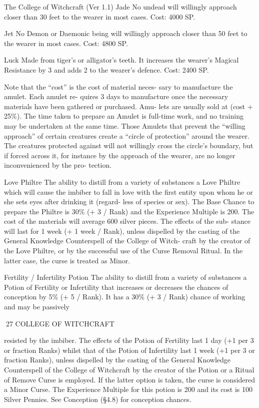 \begin{Chapter}{The College of Witchcraft (Ver 1.1)}
Jade  No  undead  will  willingly  approach  closer 
than 30 feet to the wearer in most cases. Cost: 4000 
SP. 

Jet  No  Demon  or  Daemonic  being  will  willingly 
approach closer than 50 feet to the wearer in most 
cases. Cost: 4800 SP. 

Luck  Made  from  tiger’s  or  alligator’s  teeth.  It 
increases the wearer’s Magical Resistance by 3 and 
adds 2 to the wearer’s defence. Cost: 2400 SP. 

Note  that  the  “cost”  is  the  cost  of  material  neces-
sary  to  manufacture  the  amulet.  Each  amulet  re-
quires  3  days  to  manufacture  once  the  necessary 
materials  have  been  gathered  or  purchased.  Amu-
lets  are  usually  sold  at  (cost  +  25\%).  The  time 
taken  to  prepare  an  Amulet  is  full-time  work,  and 
no  training  may  be  undertaken  at  the  same  time. 
Those Amulets that prevent the “willing approach” 
of  certain  creatures  create  a  “circle  of  protection” 
around the wearer. The creatures protected against 
will not willingly cross the circle’s boundary, but if 
forced across it, for instance by the approach of the 
wearer,  are  no  longer  inconvenienced  by  the  pro-
tection. 

Love Philtre The ability to distill from a variety of 
substances  a  Love  Philtre  which  will  cause  the 
imbiber  to  fall  in  love  with  the  first  entity  upon 
whom he or she sets eyes after drinking it (regard-
less of species or sex). The Base Chance to prepare 
the Philtre is 30\% (+ 3 / Rank) and the Experience 
Multiple  is  200.  The  cost  of  the  materials  will 
average  600  silver  pieces.  The  effects  of  the  sub-
stance  will  last  for  1  week  (+  1  week  /  Rank), 
unless  dispelled  by  the  casting  of  the  General 
Knowledge  Counterspell  of  the  College  of  Witch-
craft  by  the  creator  of  the  Love  Philtre,  or  by  the 
successful use of the Curse Removal Ritual. In the 
latter case, the curse is treated as Minor. 

Fertility  /  Infertility  Potion  The  ability  to  distill 
from a variety of substances a Potion of Fertility or 
Infertility that increases or decreases the chances of 
conception by 5\% (+ 5 / Rank). It has a 30\% (+ 3 / 
Rank)  chance  of  working  and  may  be  passively 

27 COLLEGE OF WITCHCRAFT 

resisted by the imbiber. The effects of the Potion of 
Fertility  last  1  day  (+1  per  3  or  fraction  Ranks) 
whilst  that  of  the  Potion  of  Infertility  last  1  week 
(+1  per  3  or  fraction  Ranks),  unless  dispelled  by 
the casting of the General Knowledge Counterspell 
of  the  College  of  Witchcraft  by  the  creator  of  the 
Potion or a Ritual of Remove Curse is employed. If 
the latter option is taken, the curse is considered a 
Minor  Curse.  The  Experience  Multiple  for  this 
potion is 200 and its cost is 100 Silver Pennies. See 
Conception (§4.8) for conception chances. 


\end{Chapter}
